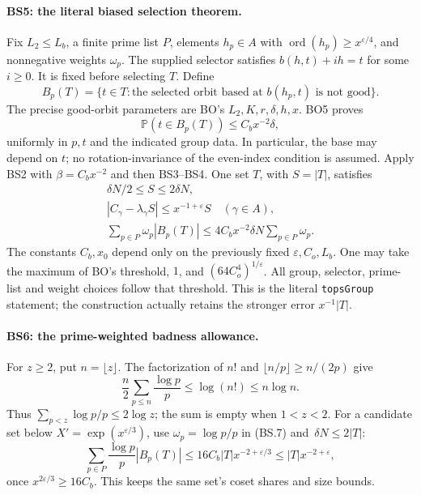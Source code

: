 \documentclass[11pt,a4paper]{article}
\numberwithin{equation}{section}
\theoremstyle{remark}\newtheorem{remark}[theorem]{Remark}
\begin{document}
\paragraph{BS5: the literal biased selection theorem.}
Fix $L_2\le L_b$, a finite prime list $P$, elements $h_p\in A$
with $\operatorname{ord}(h_p)\ge x^{\varepsilon/4}$, and
nonnegative weights $\omega_p$. The supplied selector satisfies
$b(h,t)+ih=t$ for some $i\ge0$. It is fixed before selecting $T$.
Define
\[
 B_p(T)=\{t\in T:\text{the selected orbit based at }b(h_p,t)
                       \text{ is not good}\}.
\]
The precise good-orbit parameters are BO's
$L_2,K,r,\delta,h,x$. BO5 proves
\[
 \mathbb P(t\in B_p(T))\le C_bx^{-2}\delta,
\]
uniformly in $p,t$ and the indicated group data. In particular, the
base may depend on $t$; no rotation-invariance of the even-index
condition is assumed.
Apply BS2 with $\beta=C_bx^{-2}$ and then BS3--BS4. One set $T$,
with $S=|T|$, satisfies
\[
 \boxed{\begin{gathered}
  \delta N/2\le S\le2\delta N,\\
  |C_\gamma-\lambda_\gamma S|\le
                   x^{-1+\varepsilon}S\quad(\gamma\in A),\\
  \sum_{p\in P}\omega_p|B_p(T)|
       \le4C_bx^{-2}\delta N\sum_{p\in P}\omega_p .
 \end{gathered}}                                      \tag{BS.7}
\]
The constants $C_b,x_0$ depend only on the previously fixed
$\varepsilon,C_o,L_b$. One may take the maximum of BO's threshold,
$1$, and $(64C_o^4)^{1/\varepsilon}$.
All group, selector, prime-list and weight choices follow that
threshold. This is the literal \texttt{topsGroup} statement; the
construction actually retains the stronger error $x^{-1}|T|$.

\paragraph{BS6: the prime-weighted badness allowance.}
For $z\ge2$, put $n=\lfloor z\rfloor$.
The factorization of $n!$ and
$\lfloor n/p\rfloor\ge n/(2p)$ give
\[
 \frac n2\sum_{p\le n}\frac{\log p}{p}
 \le\log(n!)\le n\log n.
\]
Thus $\sum_{p<z}\log p/p\le2\log z$; the sum is empty
when $1<z<2$. For a candidate set below
$X'=\exp(x^{\varepsilon/3})$, use
$\omega_p=\log p/p$ in (BS.7) and $\,\delta N\le2|T|$:
\[
 \sum_{p\in P}\frac{\log p}{p}|B_p(T)|
 \le16C_b|T|x^{-2+\varepsilon/3}
 \le |T|x^{-2+\varepsilon},                          \tag{BS.8}
\]
once $x^{2\varepsilon/3}\ge16C_b$. This keeps the same
set's coset shares and size bounds.
\end{document}
